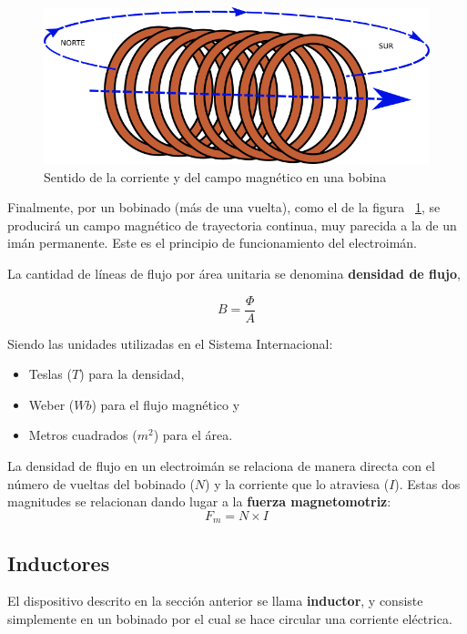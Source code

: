 \begin{figure}
	\centering
		\includegraphics[scale=0.5]{images/electroiman-bobina}
	\caption{\label{fig:electroiman-bobina} Sentido de la corriente y del campo magnético en una bobina}
\end{figure}
Finalmente, por un bobinado (más de una vuelta), como el de la figura ~\ref{fig:electroiman-bobina}, se producirá un campo magnético de trayectoria continua, muy parecida a la de un imán permanente.
Este es el principio de funcionamiento del electroimán.

La cantidad de líneas de flujo por área unitaria se denomina \textbf{densidad de flujo},

\begin{equation}
	\label{eq:densidad_flujo}
	B = \frac{\Phi}{A}
\end{equation}

Siendo las unidades utilizadas en el Sistema Internacional:
\begin{itemize}
	\item Teslas ($T$) para la densidad,
	\item Weber ($Wb$) para el flujo magnético y
	\item Metros cuadrados ($m^{2}$) para el área.
\end{itemize}

La densidad de flujo en un electroimán se relaciona de manera directa con el número de vueltas del bobinado ($N$) y la corriente que lo atraviesa ($I$). Estas dos magnitudes se relacionan dando lugar a la \textbf{fuerza magnetomotriz}:
\begin{equation}
	\label{eq:fuerza_magnetomotriz}
	F_{m} = N \times I
\end{equation}

\subsection{Inductores}

El dispositivo descrito en la sección anterior se llama \textbf{inductor}, y consiste simplemente en un bobinado por el cual se hace circular una corriente eléctrica.


